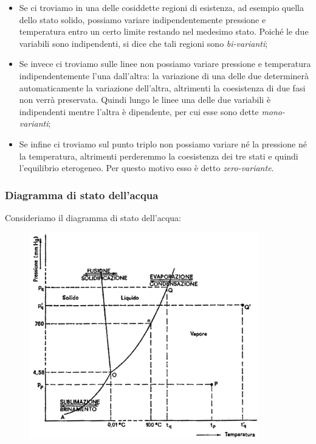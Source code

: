\begin{itemize}
    \item Se ci troviamo in una delle cosiddette regioni di esistenza, ad esempio quella dello stato solido, possiamo variare indipendentemente pressione e temperatura entro un certo limite restando nel medesimo stato. Poiché le due variabili sono indipendenti, si dice che tali regioni sono \textit{bi-varianti};
    \item Se invece ci troviamo sulle linee non possiamo variare pressione e temperatura indipendentemente l'una dall'altra: la variazione di una delle due determinerà automaticamente la variazione dell'altra, altrimenti la coesistenza di due fasi non verrà preservata. Quindi lungo le linee una delle due variabili è indipendenti mentre l'altra è dipendente, per cui esse sono dette \textit{mono-varianti};
    \item Se infine ci troviamo sul punto triplo non possiamo variare né la pressione né la temperatura, altrimenti perderemmo la coesistenza dei tre stati e quindi l'equilibrio eterogeneo. Per questo motivo esso è detto \textit{zero-variante}.
\end{itemize}

\subsubsection{Diagramma di stato dell'acqua}
Consideriamo il diagramma di stato dell'acqua:

\begin{figure}[H]
    \centering
    \includegraphics[width=10cm]{immagini/diagramma_di_stato_acqua.png}
\end{figure}

